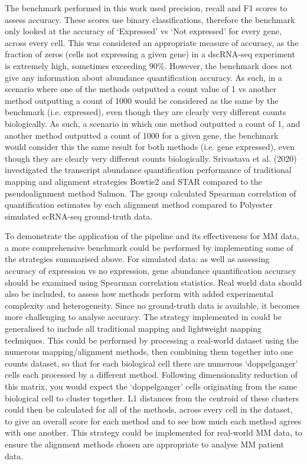 The benchmark performed in this work used precision, recall and F1 scores to assess accuracy.
These scores use binary classifications, therefore the benchmark only looked at the accuracy of `Expressed' vs `Not expressed' for every gene, across every cell.
This was considered an appropriate measure of accuracy, as the fraction of zeros (cells not expressing a given gene) in a dscRNA-seq experiment is extremely high, sometimes exceeding 90\%\cite{linderman2022zero}.
However, the benchmark does not give any information about abundance quantification accuracy.
As such, in a scenario where one of the methods outputted a count value of 1 vs another method outputting a count of 1000 would be considered as the same by the benchmark (i.e. expressed), even though they are clearly very different counts biologically.
As such, a scenario in which one method outputted a count of 1, and another method outputted a count of 1000 for a given gene, the benchmark would consider this the same result for both methods (i.e. gene expressed), even though they are clearly very different counts biologically.
Srivastava et al. (2020) investigated the transcript abundance quantification performance of traditional mapping and alignment strategies Bowtie2 and STAR compared to the pseudoalignment method Salmon\cite{srivastava2020alignment}.
The group calculated Spearman correlation of quantification estimates by each alignment method compared to Polyester simulated scRNA-seq ground-truth data.

To demonstrate the application of the pipeline and its effectiveness for MM data, a more comprehensive benchmark could be performed by implementing some of the strategies summarised above.
For simulated data: as well as assessing accuracy of expression vs no expression, gene abundance quantification accuracy should be examined using Spearman correlation statistics.
Real world data should also be included, to assess how methods perform with added experimental complexity and heterogeneity.
Since no ground-truth data is available, it becomes more challenging to analyse accuracy.
The strategy implemented in \cite{booeshaghi2021benchmarking} could be generalised to include all traditional mapping and lightweight mapping techniques.
This could be performed by processing a real-world dataset using the numerous mapping/alignment methods, then combining them together into one counts dataset, so that for each biological cell there are numerous `doppelganger' cells each processed by a different method.
Following dimensionality reduction of this matrix, you would expect the `doppelganger' cells originating from the same biological cell to cluster together.
L1 distances from the centroid of these clusters could then be calculated for all of the methods, across every cell in the dataset, to give an overall score for each method and to see how much each method agrees with one another.
This strategy could be implemented for real-world MM data, to ensure the alignment methods chosen are appropriate to analyse MM patient data.

